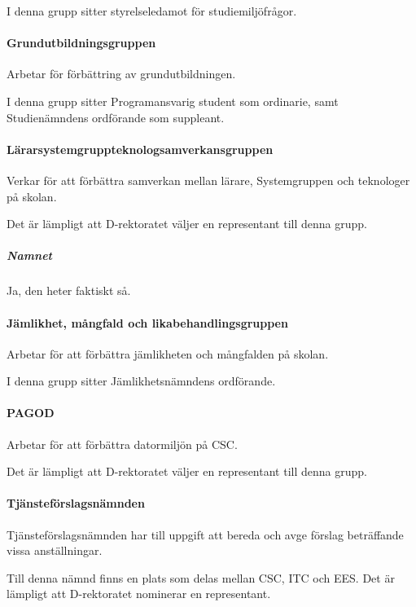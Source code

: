 \documentclass{dgovdoc}
\begin{document}
I denna grupp sitter styrelseledamot för studiemiljöfrågor.

\paragraph{Grundutbildningsgruppen}

Arbetar för förbättring av grundutbildningen.

I denna grupp sitter Programansvarig student som ordinarie, samt Studienämndens
ordförande som suppleant.

\paragraph{Lärarsystemgruppteknologsamverkansgruppen}

Verkar för att förbättra samverkan mellan lärare, Systemgruppen och teknologer
på skolan.

Det är lämpligt att D-rektoratet väljer en representant till denna grupp.

\subparagraph{Namnet}

Ja, den heter faktiskt så.

\paragraph{Jämlikhet, mångfald och likabehandlingsgruppen}

Arbetar för att förbättra jämlikheten och mångfalden på skolan.

I denna grupp sitter Jämlikhetsnämndens ordförande.

\paragraph{PAGOD}

Arbetar för att förbättra datormiljön på CSC.

Det är lämpligt att D-rektoratet väljer en representant till denna grupp.

\paragraph{Tjänsteförslagsnämnden}

Tjänsteförslagsnämnden har till uppgift att bereda och avge förslag beträffande
vissa anställningar.

Till denna nämnd finns en plats som delas mellan CSC, ITC och EES. Det är
lämpligt att D-rektoratet nominerar en representant.
\end{document}
